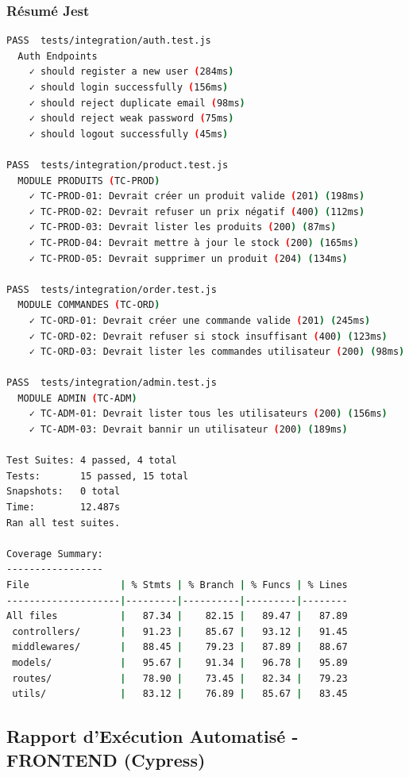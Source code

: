 \documentclass[12pt,a4paper]{article}
\begin{document}
\subsubsection{Résumé Jest}
\begin{lstlisting}[language=bash]
PASS  tests/integration/auth.test.js
  Auth Endpoints
    ✓ should register a new user (284ms)
    ✓ should login successfully (156ms)
    ✓ should reject duplicate email (98ms)
    ✓ should reject weak password (75ms)
    ✓ should logout successfully (45ms)

PASS  tests/integration/product.test.js
  MODULE PRODUITS (TC-PROD)
    ✓ TC-PROD-01: Devrait créer un produit valide (201) (198ms)
    ✓ TC-PROD-02: Devrait refuser un prix négatif (400) (112ms)
    ✓ TC-PROD-03: Devrait lister les produits (200) (87ms)
    ✓ TC-PROD-04: Devrait mettre à jour le stock (200) (165ms)
    ✓ TC-PROD-05: Devrait supprimer un produit (204) (134ms)

PASS  tests/integration/order.test.js
  MODULE COMMANDES (TC-ORD)
    ✓ TC-ORD-01: Devrait créer une commande valide (201) (245ms)
    ✓ TC-ORD-02: Devrait refuser si stock insuffisant (400) (123ms)
    ✓ TC-ORD-03: Devrait lister les commandes utilisateur (200) (98ms)

PASS  tests/integration/admin.test.js
  MODULE ADMIN (TC-ADM)
    ✓ TC-ADM-01: Devrait lister tous les utilisateurs (200) (156ms)
    ✓ TC-ADM-03: Devrait bannir un utilisateur (200) (189ms)

Test Suites: 4 passed, 4 total
Tests:       15 passed, 15 total
Snapshots:   0 total
Time:        12.487s
Ran all test suites.

Coverage Summary:
-----------------
File                | % Stmts | % Branch | % Funcs | % Lines
--------------------|---------|----------|---------|--------
All files           |   87.34 |    82.15 |   89.47 |   87.89
 controllers/       |   91.23 |    85.67 |   93.12 |   91.45
 middlewares/       |   88.45 |    79.23 |   87.89 |   88.67
 models/            |   95.67 |    91.34 |   96.78 |   95.89
 routes/            |   78.90 |    73.45 |   82.34 |   79.23
 utils/             |   83.12 |    76.89 |   85.67 |   83.45
\end{lstlisting}

\subsection{Rapport d'Exécution Automatisé - FRONTEND (Cypress)}
\end{document}
